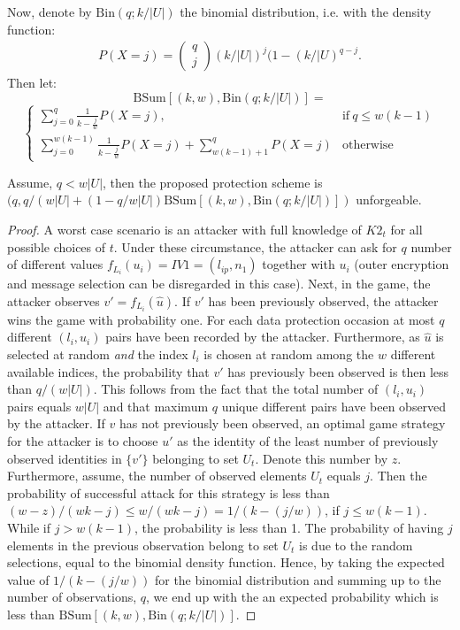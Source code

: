 {Now, denote by $\text{Bin}(q; k/|U|)$ the binomial distribution, i.e. with the density function:
\begin{eqnarray*}
P(X=j) = 
\begin{pmatrix}
q \\
j
\end{pmatrix}
(k/|U|)^j(1-(k/|U)^{q-j}.
\end{eqnarray*}
Then let: 
\[
 \text{BSum}[(k,w),\text{Bin}(q;k/|U|)] =
 \]
 \[
\begin{cases}
\sum\limits_{j=0}^{q} \frac{1}{k-\frac{j}{w}} P(X=j), & \text{if} \ q \leq w(k-1) \\
\sum\limits_{j=0}^{w(k-1)}\!\frac{1}{k-\frac{j}{w}} P(X=j) + \!\!\!\!\!\! \sum\limits_{w(k-1)+1}^q \!\!\!\!\!P(X=j) & \!\text{otherwise}
\end{cases}
\]
\begin{prop}
\label{analysis:idunforgeable}
Assume, $q < w|U|$, then the proposed protection scheme is \\  $(q,q/(w|U|+(1-q/w|U|)\text{BSum}[(k,w),\text{Bin}(q;k/|U|)])$ unforgeable. 
\end{prop}
\begin{proof}
A worst case scenario is an attacker with full knowledge of $K2_t$ for all possible choices of $t$. Under these circumstance, the attacker can ask for $q$ number of different values $f_{L_i}(u_i) = IV1 = (l_{ip},n_1)$  together with $u_i$ (outer encryption and message selection can be disregarded in this case). Next, in the game, the attacker observes $v' = f_{L_i}(\hat{u})$. If $v'$ has been previously observed, the attacker wins the game with probability one. For each data protection occasion at most $q$ different $(l_{i}, u_i)$ pairs have been recorded by the attacker. Furthermore, as $\hat{u}$ is selected at random \textit{and} the index $l_{i}$ is chosen at random among the $w$ different available indices, the probability that $v'$ has previously been observed is then less than $q/(w|U|)$. This follows from the fact that the total number of $(l_{i}, u_i)$ pairs equals $w|U|$ and that maximum $q$ unique different pairs have been observed by the attacker. If $v$ has not previously been observed, an optimal game strategy for the attacker is to choose $u'$ as the identity of the least number of previously observed identities in $\{v'\}$ belonging to set $U_t$. Denote this number by $z$.  Furthermore, assume, the number of observed elements $U_t$ equals $j$. Then the probability of successful attack for this strategy is less than $(w-z)/(wk-j) \leq w/(wk-j) = 1/(k-(j/w))$, if $j\leq w(k-1)$. While if $j>w(k-1)$, the probability is less than 1. The probability of having $j$ elements in the previous observation belong to set $U_t$ is due to the random selections, equal to the binomial density function. Hence, by taking the expected value of $1/(k-(j/w))$ for the binomial distribution and summing up to the number of observations, $q$, we end up with the an expected probability which is less than $\text{BSum}[(k,w),\text{Bin}(q;k/|U|)]$.

\end{proof}}
